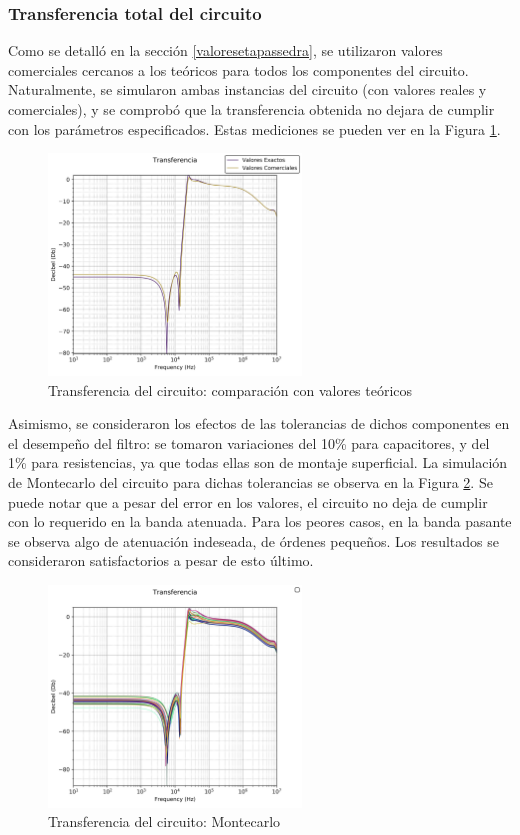 \documentclass[spanish]{article}
\begin{document}
\subsubsection{Transferencia total del circuito} \label{transftotalcirc}
Como se detalló en la sección \ref{valoresetapassedra}, se utilizaron valores comerciales cercanos a los teóricos para todos los componentes del circuito. Naturalmente, se simularon ambas instancias del circuito (con valores reales y comerciales), y se comprobó que la transferencia obtenida no dejara de cumplir con los parámetros especificados. Estas mediciones se pueden ver en la Figura \ref{exactosvscomerciales}.
\begin{figure}[H]
    \centering
    \includegraphics[width=0.6\textwidth]{Resources/exactosvscomerciales.png}
    \caption{Transferencia del circuito: comparación con valores teóricos}
    \label{exactosvscomerciales}
\end{figure}

Asimismo, se consideraron los efectos de las tolerancias de dichos componentes en el desempeño del filtro: se tomaron variaciones del 10\% para capacitores, y del 1\% para resistencias, ya que todas ellas son de montaje superficial. La simulación de Montecarlo del circuito para dichas tolerancias se observa en la Figura \ref{transfmontecarlo}. Se puede notar que a pesar del error en los valores, el circuito no deja de cumplir con lo requerido en la banda atenuada. Para los peores casos, en la banda pasante se observa algo de atenuación indeseada, de órdenes pequeños. Los resultados se consideraron satisfactorios a pesar de esto último.

\begin{figure}[H]
    \centering
    \includegraphics[width=0.6\textwidth]{Resources/transfmontecarlo.png}
    \caption{Transferencia del circuito: Montecarlo}
    \label{transfmontecarlo}
\end{figure}
\end{document}
